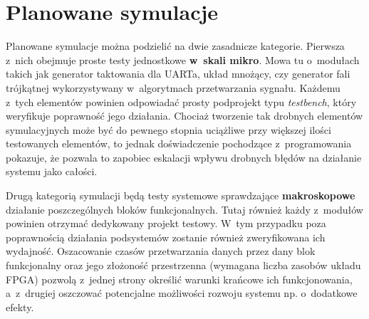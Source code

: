 
\section{Planowane symulacje}

Planowane symulacje można podzielić na dwie zasadnicze kategorie. Pierwsza z~nich obejmuje proste testy jednostkowe \textbf{w~skali mikro}. Mowa tu o~modułach takich jak generator taktowania dla UARTa, układ mnożący, czy generator fali trójkątnej wykorzystywany w~algorytmach przetwarzania sygnału. Każdemu z~tych elementów powinien odpowiadać prosty podprojekt typu \textit{testbench}, który weryfikuje poprawność jego działania. Chociaż tworzenie tak drobnych elementów symulacyjnych może być do pewnego stopnia uciążliwe przy większej ilości testowanych elementów, to jednak doświadczenie pochodzące z~programowania pokazuje, że pozwala to zapobiec eskalacji wpływu drobnych błędów na działanie systemu jako całości.

Drugą kategorią symulacji będą testy systemowe sprawdzające \textbf{makroskopowe} działanie poszczególnych bloków funkcjonalnych. Tutaj również każdy z~modułów powinien otrzymać dedykowany projekt testowy. W~tym przypadku poza poprawnością działania podsystemów zostanie również zweryfikowana ich wydajność. Oszacowanie czasów przetwarzania danych przez dany blok funkcjonalny oraz jego złożoność przestrzenna (wymagana liczba zasobów układu FPGA) pozwolą z~jednej strony określić warunki krańcowe ich funkcjonowania, a~z~drugiej oszczować potencjalne możliwości rozwoju systemu np. o~dodatkowe efekty.
